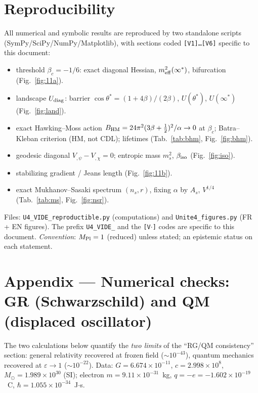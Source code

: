 \documentclass[11pt,a4paper]{article}
\newcommand{\Mpl}{M_{\rm Pl}}
\newcommand{\fpole}{\infty^*}
\begin{document}
\section*{Reproducibility}
All numerical and symbolic results are reproduced by two standalone scripts (SymPy/SciPy/NumPy/Matplotlib), with sections coded \texttt{[V1]\dots[V6]} specific to this document:
\begin{itemize}[leftmargin=1.4em,itemsep=0pt]
\item[\texttt{[V1]}] threshold $\beta_c=-1/6$: exact diagonal Hessian, $m^2_{\rm eff}(\fpole)$, bifurcation (Fig.~\ref{fig:11a}).
\item[\texttt{[V2]}] landscape $U_{\rm diag}$: barrier $\cos\theta^*=(1+4\beta)/(2\beta)$, $U(\theta^*)$, $U(\fpole)$ (Fig.~\ref{fig:land}).
\item[\texttt{[V3]}] exact Hawking--Moss action $B_{\rm HM}=24\pi^2(3\beta+\tfrac12)^2/\alpha\to0$ at $\beta_c$; Batra--Kleban criterion (HM, not CDL); lifetimes (Tab.~\ref{tab:bhm}, Fig.~\ref{fig:bhm}).
\item[\texttt{[V4]}] geodesic diagonal $V_{,\psi}-V_{,\chi}=0$; entropic mass $m^2_s$, $\beta_{\rm iso}$ (Fig.~\ref{fig:iso}).
\item[\texttt{[V5]}] stabilizing gradient / Jeans length (Fig.~\ref{fig:11b}).
\item[\texttt{[V6]}] exact Mukhanov--Sasaki spectrum $(n_s,r)$, fixing $\alpha$ by $A_s$, $V^{1/4}$ (Tab.~\ref{tab:ms}, Fig.~\ref{fig:nsr}).
\end{itemize}
Files: \texttt{U4\_VIDE\_reproductible.py} (computations) and \texttt{Unite4\_figures.py} (FR + EN figures). The prefix \texttt{U4\_VIDE\_} and the \texttt{[V$\cdot$]} codes are specific to this document. \emph{Convention}: $\Mpl=1$ (reduced) unless stated; an epistemic status on each statement.

\section*{Appendix --- Numerical checks: GR (Schwarzschild) and QM (displaced oscillator)}
\small
The two calculations below quantify the \emph{two limits} of the ``RG/QM consistency'' section: general relativity recovered at frozen field ($\sim10^{-43}$), quantum mechanics recovered at $\varepsilon\to1$ ($\sim10^{-22}$). Data: $G=6.674\times10^{-11}$, $c=2.998\times10^{8}$, $M_\odot=1.989\times10^{30}$ (SI); electron $m=9.11\times10^{-31}$~kg, $q=-e=-1.602\times10^{-19}$~C, $\hbar=1.055\times10^{-34}$~J$\cdot$s.
\end{document}
